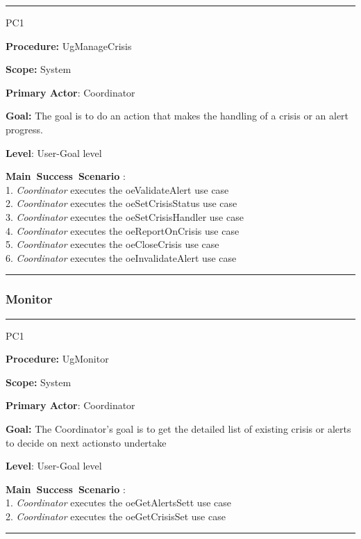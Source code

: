 \vspace{0.5cm}
\hrule
\begin{lyxlist}{PC1}
\small{
\item [\textbf{Procedure:}] UgManageCrisis
\item [\textbf{Scope:}] System
\item [\textbf{Primary Actor}:] Coordinator
\item [\textbf{Goal:}] The goal is to do an action that makes the handling of a crisis or an alert progress.
\item [\textbf{Level}:] User-Goal level
\item [\textbf{Main~Success~Scenario}]:\\
1. \emph{Coordinator} executes the oeValidateAlert use case\\
2. \emph{Coordinator} executes the oeSetCrisisStatus use case\\
3. \emph{Coordinator} executes the oeSetCrisisHandler use case\\
4. \emph{Coordinator} executes the oeReportOnCrisis use case\\
5. \emph{Coordinator} executes the oeCloseCrisis use case\\
6. \emph{Coordinator} executes the oeInvalidateAlert use case\\
}

\end{lyxlist}
\hrule
\vspace{0.5cm}

\subsubsection{Monitor}

\vspace{0.5cm}
\hrule
\begin{lyxlist}{PC1}
\small{
\item [\textbf{Procedure:}] UgMonitor
\item [\textbf{Scope:}] System
\item [\textbf{Primary Actor}:] Coordinator
\item [\textbf{Goal:}] The Coordinator’s goal is to get the detailed list of
existing crisis or alerts to decide on next actionsto undertake
\item [\textbf{Level}:] User-Goal level
\item [\textbf{Main~Success~Scenario}]:\\
1. \emph{Coordinator} executes the oeGetAlertsSett use case\\
2. \emph{Coordinator} executes the oeGetCrisisSet use case\\
}

\end{lyxlist}
\hrule
\vspace{0.5cm}



